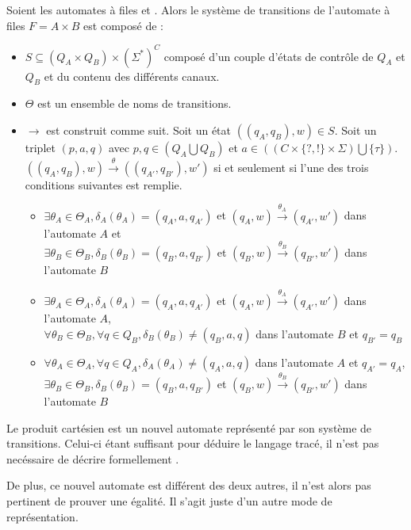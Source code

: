 Soient les automates à files \fifoA et \fifoB. Alors le système de transitions \tsys de l'automate à files $F=A\times B$ est composé de :
\begin{itemize}
  \item $S \subseteq (Q_A\times Q_B)\times (\Sigma^*)^C$ composé d'un couple d'états de contrôle de $Q_A$ et $Q_B$ et du contenu des différents canaux.
  \item $\Theta$ est un ensemble de noms de transitions.
  \item $\rightarrow$ est construit comme suit. Soit un état $((q_A,q_B), w)\in S$. Soit un triplet $(p,a,q)$ avec $p,q \in (Q_A \bigcup Q_B)$ et $a \in ((C \times \{?,!\} \times \Sigma) \bigcup \{\tau\})$.
  $((q_A,q_B),w)\xrightarrow{\theta}((q_{A'},q_{B'}),w')$ si et seulement si l'une des trois conditions suivantes est remplie.
  \begin{itemize}
    \item $\exists \theta_A\in\Theta_A, \delta_A(\theta_A)=(q_A,a,q_{A'})$ et  $(q_A,w)\xrightarrow{\theta_A}(q_{A'},w')$ dans l'automate $A$ et\\ $\exists \theta_B\in\Theta_B, \delta_B(\theta_B)=(q_B,a,q_{B'})$ et $(q_B,w)\xrightarrow{\theta_B}(q_{B'},w')$ dans l'automate $B$
    \item $\exists \theta_A\in\Theta_A, \delta_A(\theta_A)=(q_A,a,q_{A'})$ et  $(q_A,w)\xrightarrow{\theta_A}(q_{A'},w')$ dans l'automate $A$,\\
    $\forall \theta_B\in\Theta_B,\forall q \in Q_B,\delta_B(\theta_B)\neq(q_B,a,q)$ dans l'automate $B$ et $q_{B'}=q_B$
    \item $\forall \theta_A\in\Theta_A,\forall q \in Q_A,\delta_A(\theta_A)\neq(q_A,a,q)$ dans l'automate $A$ et $q_{A'}=q_A$,\\
    $\exists \theta_B\in\Theta_B, \delta_B(\theta_B)=(q_B,a,q_{B'})$ et  $(q_B,w)\xrightarrow{\theta_B}(q_{B'},w')$ dans l'automate $B$
  \end{itemize}
\end{itemize}

Le produit cartésien est un nouvel automate représenté par son système de transitions. Celui-ci étant suffisant pour déduire le langage tracé, il n'est pas necéssaire de décrire formellement \fifo.

De plus, ce nouvel automate est différent des deux autres, il n'est alors pas pertinent de prouver une égalité. Il s'agit juste d'un autre mode de représentation.



